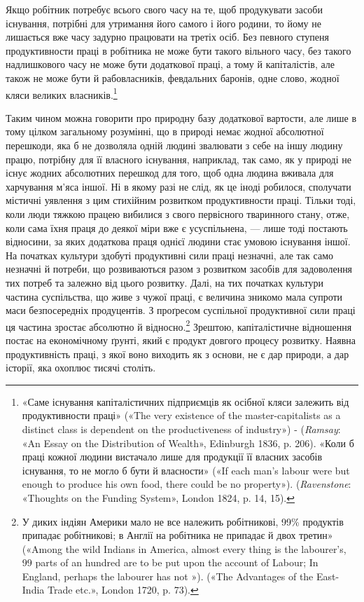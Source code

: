 Якщо робітник потребує всього свого часу на те, щоб продукувати
засоби існування, потрібні для утримання його самого і
його родини, то йому не лишається вже часу задурно працювати
на третіх осіб. Без певного ступеня продуктивности праці в робітника
не може бути такого вільного часу, без такого надлишкового
часу не може бути додаткової праці, а тому й капіталістів,
але також не може бути й рабовласників, февдальних баронів,
одне слово, жодної кляси великих власників.\footnote{
«Саме існування капіталістичних підприємців як осібної кляси
залежить від продуктивности праці» («The very existence of the master-capitalists
as a distinct class is dependent on the productiveness
of industry») - (\emph{Ramsay}: «An Essay on the Distribution of Wealth»,
Edinburgh 1836, p. 206). «Коли б праці кожної людини вистачало лише
для продукції її власних засобів існування, то не могло б бути й власности»
(«If each man’s labour were but enough to produce his own food,
there could be no property»). (\emph{Ravenstone}: «Thoughts on the Funding
System», London 1824, p. 14, 15).
}

Таким чином можна говорити про природну базу додаткової
вартости, але лише в тому цілком загальному розумінні, що в
природі немає жодної абсолютної перешкоди, яка б не дозволяла
одній людині звалювати з себе на іншу людину працю, потрібну
для її власного існування, наприклад, так само, як у природі
не існує жодних абсолютних перешкод для того, щоб одна людина
вживала для харчування м’яса іншої. Ні в якому разі не
слід, як це іноді робилося, сполучати містичні уявлення з
цим стихійним розвитком продуктивности праці. Тільки тоді,
коли люди тяжкою працею вибилися з свого первісного тваринного
стану, отже, коли сама їхня праця до деякої міри вже є
усуспільнена, — лише тоді постають відносини, за яких додаткова
праця однієї людини стає умовою існування іншої. На початках
культури здобуті продуктивні сили праці незначні, але так само
незначні й потреби, що розвиваються разом з розвитком засобів
для задоволення тих потреб та залежно від цього розвитку. Далі,
на тих початках культури частина суспільства, що живе з чужої
праці, є величина зникомо мала супроти маси безпосередніх продуцентів.
З проґресом суспільної продуктивної сили праці ця
частина зростає абсолютно й відносно.\footnote{
У диких індіян Америки мало не все належить робітникові, 99\%
продуктів припадає робітникові; в Англії на робітника не припадає й
двох третин» («Among the wild Indians in America, almost every thing
is the labourer’s, 99 parts of an hundred are to be put upon the account of
Labour; In England, perhaps the labourer has not »). («The Advantages
of the East-India Trade etc.», London 1720, p. 73).
} Зрештою, капіталістичне
відношення постає на економічному ґрунті, який є продукт
довгого процесу розвитку. Наявна продуктивність праці,
з якої воно виходить як з основи, не є дар природи, а дар історії,
яка охоплює тисячі століть.

